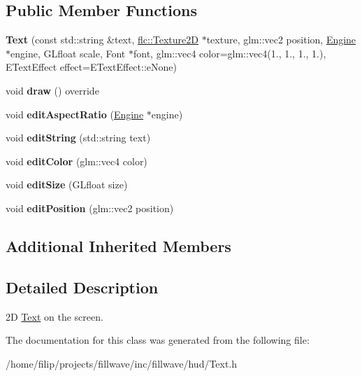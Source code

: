\subsection*{Public Member Functions}
\begin{DoxyCompactItemize}
\item 
\mbox{\label{classflw_1_1flf_1_1Text_aa739ee791f8ea60f196a411dd0f84ce0}} 
{\bfseries Text} (const std\+::string \&text, \hyperlink{classflw_1_1flc_1_1Texture2D}{flc\+::\+Texture2D} $\ast$texture, glm\+::vec2 position, \hyperlink{classflw_1_1Engine}{Engine} $\ast$engine, G\+Lfloat scale, Font $\ast$font, glm\+::vec4 color=glm\+::vec4(1., 1., 1., 1.), E\+Text\+Effect effect=E\+Text\+Effect\+::e\+None)
\item 
\mbox{\label{classflw_1_1flf_1_1Text_a5860fbb726f7b4d54e3a04c04199950d}} 
void {\bfseries draw} () override
\item 
\mbox{\label{classflw_1_1flf_1_1Text_a02884e95bd7ada642bd6d01449852b4a}} 
void {\bfseries edit\+Aspect\+Ratio} (\hyperlink{classflw_1_1Engine}{Engine} $\ast$engine)
\item 
\mbox{\label{classflw_1_1flf_1_1Text_ae14a3938af5dba9ab65bc0df2ce2505e}} 
void {\bfseries edit\+String} (std\+::string text)
\item 
\mbox{\label{classflw_1_1flf_1_1Text_ad6c8bcb7787f6605135c960ffda69f8a}} 
void {\bfseries edit\+Color} (glm\+::vec4 color)
\item 
\mbox{\label{classflw_1_1flf_1_1Text_a6e1aedb4fd4197ee69c40f24c3e61d69}} 
void {\bfseries edit\+Size} (G\+Lfloat size)
\item 
\mbox{\label{classflw_1_1flf_1_1Text_a1b245a409e1f177182f7cb1fd4313315}} 
void {\bfseries edit\+Position} (glm\+::vec2 position)
\end{DoxyCompactItemize}
\subsection*{Additional Inherited Members}


\subsection{Detailed Description}
2D \hyperlink{classflw_1_1flf_1_1Text}{Text} on the screen. 

The documentation for this class was generated from the following file\+:\begin{DoxyCompactItemize}
\item 
/home/filip/projects/fillwave/inc/fillwave/hud/Text.\+h\end{DoxyCompactItemize}
